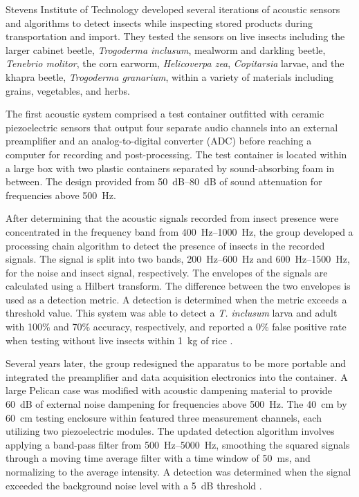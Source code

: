 \documentclass[../Vibro-Acoustic Signatures and Detection Algorithms for Stored Product Insects.tex]{subfiles}
\begin{document}
Stevens Institute of Technology developed several iterations of acoustic sensors and algorithms to detect insects while inspecting stored products during transportation and import. They tested the sensors on live insects including the larger cabinet beetle, \textit{Trogoderma inclusum}, mealworm and darkling beetle, \textit{Tenebrio molitor}, the corn earworm, \textit{Helicoverpa zea}, \textit{Copitarsia} larvae, and the khapra beetle, \textit{Trogoderma granarium}, within a variety of materials including grains, vegetables, and herbs.

The first acoustic system comprised a test container outfitted with ceramic piezoelectric sensors that output four separate audio channels into an external preamplifier and an analog-to-digital converter (ADC) before reaching a computer for recording and post-processing. The test container is located within a large box with two plastic containers separated by sound-absorbing foam in between. The design provided from \SIrange{50}{80}{\deci\bel} of sound attenuation for frequencies above \SI{500}{\hertz}.

After determining that the acoustic signals recorded from insect presence were concentrated in the frequency band from \SIrange{400}{1000}{\hertz}, the group developed a processing chain algorithm to detect the presence of insects in the recorded signals. The signal is split into two bands, \SIrange{200}{600}{\hertz} and \SIrange{600}{1500}{\hertz}, for the noise and insect signal, respectively. The envelopes of the signals are calculated using a Hilbert transform. The difference between the two envelopes is used as a detection metric. A detection is determined when the metric exceeds a threshold value. This system was able to detect a \textit{T. inclusum} larva and adult with 100\% and 70\% accuracy, respectively, and reported a 0\% false positive rate when testing without live insects within \SI{1}{\kilo\gram} of rice \cite{flynnAcousticMethodsInvasive2016}.

Several years later, the group redesigned the apparatus to be more portable and integrated the preamplifier and data acquisition electronics into the container. A large Pelican case was modified with acoustic dampening material to provide \SI{60}{\deci\bel} of external noise dampening for frequencies above \SI{500}{\hertz}. The \SI{40}{\centi\meter} by \SI{60}{\centi\meter} testing enclosure within featured three measurement channels, each utilizing two piezoelectric modules. The updated detection algorithm involves applying a band-pass filter from \SIrange{500}{5000}{\hertz}, smoothing the squared signals through a moving time average filter with a time window of \SI{50}{\milli\second}, and normalizing to the average intensity. A detection was determined when the signal exceeded the background noise level with a \SI{5}{\deci\bel} threshold \cite{sutinVibroacousticMethodsInsect2017}.

\newpage
\end{document}

